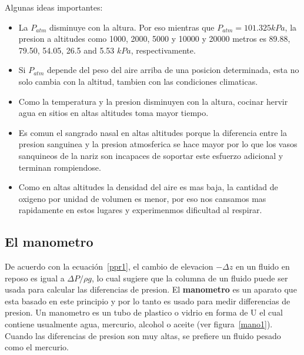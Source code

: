 \documentclass[10pt, oneside]{article}
\begin{document}
Algunas ideas importantes:
\begin{itemize}
\item La $P_{atm}$ disminuye con la altura. Por eso mientras que $P_{atm}=101.325 kPa$, la presion a altitudes como 1000, 2000, 5000 y 10000 y 20000 metros es 89.88, 79.50, 54.05, 26.5 and 5.53 $kPa$, respectivamente.
\item Si $P_{atm}$ depende del peso del aire arriba de una posicion determinada, esta no solo cambia con la altitud, tambien con las condiciones climaticas.
\item Como la temperatura y la presion disminuyen con la altura, cocinar hervir agua en sitios en altas altitudes toma mayor tiempo.
\item Es comun el sangrado nasal en altas altitudes porque la diferencia entre la presion sanguinea y la presion atmosferica se hace mayor por lo que los vasos sanquineos de la nariz son incapaces de soportar este esfuerzo adicional y terminan rompiendose. 
\item Como en altas altitudes la densidad del aire es mas baja, la cantidad de oxigeno por unidad de volumen es menor, por eso nos cansamos mas rapidamente en estos lugares y experimenmos dificultad al respirar.
\end{itemize}

\subsection{El manometro}
De acuerdo con la ecuaci\'on~\ref{ppr1}, el cambio de elevacion $-\Delta z$ en un fluido en reposo es igual a $\Delta P/\rho g$, lo cual sugiere que la columna de un fluido puede ser usada para calcular las diferencias de presion. El \textbf{manometro} es un aparato que esta basado en este principio y por lo tanto es usado para medir differencias de presion. Un manometro es un tubo de plastico o vidrio en forma de U el cual contiene usualmente agua, mercurio, alcohol o aceite (ver figura~\ref{mano1}). Cuando las diferencias de presion son muy  altas, se prefiere un fluido pesado como el mercurio.
\end{document}
